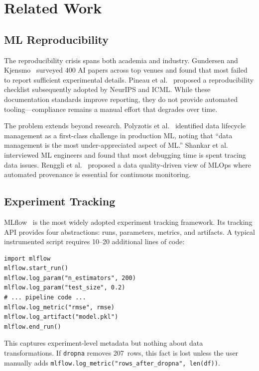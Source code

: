 \documentclass[10pt,twocolumn]{article}
\begin{document}
\section{Related Work}
\label{sec:related}

\subsection{ML Reproducibility}

The reproducibility crisis spans both academia and industry. Gundersen and Kjensmo~\cite{gundersen2018} surveyed 400 AI papers across top venues and found that most failed to report sufficient experimental details. Pineau et al.~\cite{pineau2021} proposed a reproducibility checklist subsequently adopted by NeurIPS and ICML. While these documentation standards improve reporting, they do not provide automated tooling---compliance remains a manual effort that degrades over time.

The problem extends beyond research. Polyzotis et al.~\cite{polyzotis2018} identified data lifecycle management as a first-class challenge in production ML, noting that ``data management is the most under-appreciated aspect of ML.'' Shankar et al.~\cite{shankar2022} interviewed ML engineers and found that most debugging time is spent tracing data issues. Renggli et al.~\cite{renggli2021} proposed a data quality-driven view of MLOps where automated provenance is essential for continuous monitoring.

\subsection{Experiment Tracking}

MLflow~\cite{zaharia2018} is the most widely adopted experiment tracking framework. Its tracking API provides four abstractions: runs, parameters, metrics, and artifacts. A typical instrumented script requires 10--20 additional lines of code:

\begin{lstlisting}[numbers=none]
import mlflow
mlflow.start_run()
mlflow.log_param("n_estimators", 200)
mlflow.log_param("test_size", 0.2)
# ... pipeline code ...
mlflow.log_metric("rmse", rmse)
mlflow.log_artifact("model.pkl")
mlflow.end_run()
\end{lstlisting}

This captures experiment-level metadata but nothing about data transformations. If \texttt{dropna} removes 207~rows, this fact is lost unless the user manually adds \texttt{mlflow.log\_metric("rows\_after\_dropna", len(df))}.
\end{document}
